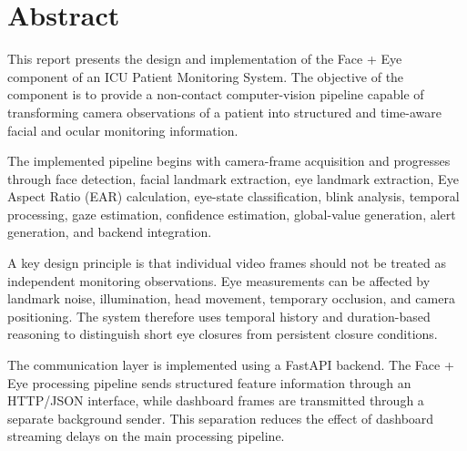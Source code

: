 \documentclass{tietreport}
\author{
    \texttt{1024240039} Harjot Singh\\
    \texttt{1024240103} Pahul Singh
}
\begin{document}

\maketitle




\chapter*{Abstract}


This report presents the design and implementation of the Face + Eye
component of an ICU Patient Monitoring System. The objective of the
component is to provide a non-contact computer-vision pipeline capable
of transforming camera observations of a patient into structured and
time-aware facial and ocular monitoring information.

The implemented pipeline begins with camera-frame acquisition and
progresses through face detection, facial landmark extraction, eye
landmark extraction, Eye Aspect Ratio (EAR) calculation, eye-state
classification, blink analysis, temporal processing, gaze estimation,
confidence estimation, global-value generation, alert generation, and
backend integration.

A key design principle is that individual video frames should not be
treated as independent monitoring observations. Eye measurements can be
affected by landmark noise, illumination, head movement, temporary
occlusion, and camera positioning. The system therefore uses temporal
history and duration-based reasoning to distinguish short eye closures
from persistent closure conditions.

The communication layer is implemented using a FastAPI backend. The
Face + Eye processing pipeline sends structured feature information
through an HTTP/JSON interface, while dashboard frames are transmitted
through a separate background sender. This separation reduces the effect
of dashboard streaming delays on the main processing pipeline.
\end{document}
